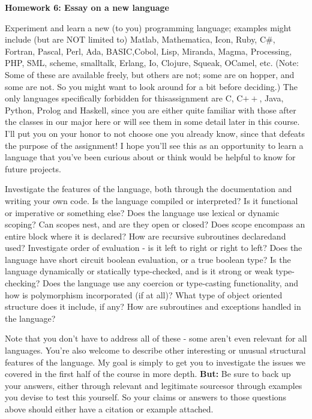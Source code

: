 \documentclass[11pt]{article}
\begin{document}

\begin{center}

{\Large\bf Homework 6: Essay on a new language}
\\[.25in]

\end{center}

Experiment  and  learn  a  new  (to  you)  programming  language; examples  might  include  (but are NOT limited to) Matlab, Mathematica, Icon, Ruby, C\#, Fortran, Pascal, Perl, Ada, BASIC,Cobol,  Lisp,  Miranda,  Magma,  Processing,  PHP,  SML,  scheme,  smalltalk,  Erlang,  Io,  Clojure, Squeak, OCamel, etc.  (Note:  Some of these are available freely, but others are not; some are on hopper, and some are not. So you might want to look around for a bit before deciding.)  The only languages specifically forbidden for thisassignment are C, C$++$, Java, Python, Prolog and Haskell, since you are either quite familiar with those after the classes in our major here or will see them in some detail later in this course.  I'll put you on your honor to not choose one you already know, since that defeats the purpose of the assignment!  I hope you'll see this as an opportunity to learn a language that you've been curious about or think would be helpful to know for future projects.

Investigate the features of the language, both through the documentation and writing your own code.  Is the language compiled or interpreted?  Is it functional or imperative or something else? Does the language use lexical or dynamic scoping?  Can scopes nest, and are they open or closed? Does scope encompass an entire block where it is declared?  How are recursive subroutines declaredand used?  Investigate order of evaluation - is it left to right or right to left?  Does the language have short circuit boolean evaluation, or a true boolean type?  Is the language dynamically or statically type-checked,  and  is  it  strong  or  weak  type-checking?   Does  the  language  use  any  coercion  or type-casting functionality, and how is polymorphism incorporated (if at all)?  What type of object oriented  structure  does  it  include,  if  any?   How  are  subroutines  and  exceptions  handled  in  the language? 

Note that you don’t have to address all of these - some aren’t even relevant for all languages.  You're also welcome to describe other interesting or unusual structural features of the language.  My goal is simply to get you to investigate the issues we covered in the first half of the course in more depth. {\bf But:} Be sure to back up your answers, either through relevant and legitimate sourcesor  through  examples  you  devise  to  test  this  yourself.  So your  claims  or  answers  to  those  questions  above should either have a citation or example attached. 
\end{document}
